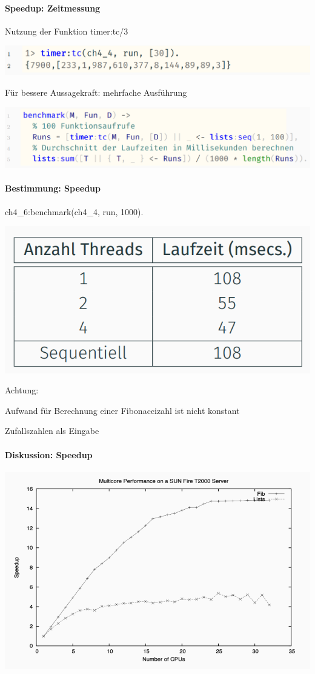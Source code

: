 \documentclass[10pt]{article}
\begin{document}
\paragraph{Speedup: Zeitmessung}

Nutzung der Funktion timer:tc/3
\begin{center}
  \includegraphics[width=0.4\linewidth]{Assets/Programmierparadigmen-code-snippet-09}
\end{center}
Für bessere Aussagekraft: mehrfache Ausführung
\begin{center}
  \includegraphics[width=0.4\linewidth]{Assets/Programmierparadigmen-code-snippet-10}
\end{center}

\paragraph{Bestimmung: Speedup}

ch4\_6:benchmark(ch4\_4, run, 1000).
\begin{center}
  \includegraphics[width=0.4\linewidth]{Assets/Programmierparadigmen-Speedup-Bestimmung}
\end{center}
\color{orange} Achtung: \color{black}
\begin{itemize*}
  \item Aufwand für Berechnung einer Fibonaccizahl ist nicht konstant
  \item Zufallszahlen als Eingabe
\end{itemize*}

\paragraph{Diskussion: Speedup}

\begin{center}
  \includegraphics[width=0.4\linewidth]{Assets/Programmierparadigmen-Speedup-Diskussion}
\end{center}
\end{document}
